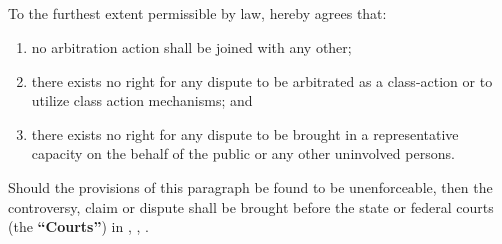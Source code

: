 {        \subsection{}
        To the furthest extent permissible by law, \counterpartytitle hereby agrees that:
        \begin{enumerate}
          \item no arbitration action shall be joined with any other;
          \item there exists no right for any dispute to be arbitrated as a class-action or to utilize class action mechanisms; and
          \item there exists no right for any dispute to be brought in a representative capacity on the behalf of the public or any other uninvolved persons.
        \end{enumerate}
        Should the provisions of this paragraph be found to be unenforceable, then the controversy, claim or dispute shall be brought before the state or federal courts (the \textbf{``Courts''}) in \companycity, \companystate, \companycountry.
}


\newcommand{\severability}{
    \section{Severability}
    If a court or other body of competent jurisdiction finds, or the Parties mutually believe, any provision of this Agreement, or portion thereof, to be invalid or unenforceable, such provision will be enforced to the maximum extent permissible so as to affect the intent of the Parties, and the remainder of this Agreement will continue in full force and effect.
}


\newcommand{\entireagreement}{
    \section{Entire Agreement}
    This Agreement expresses the complete understanding of the Parties with respect to the subject matter and supersedes all prior proposals, agreements, representations, and understandings. This Agreement may not be amended except in writing signed by both Parties.
}

